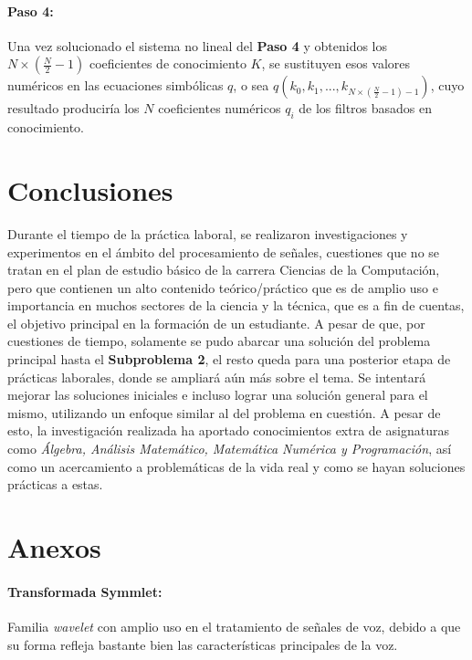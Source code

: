 \documentclass[11pt]{article}
\begin{document}
\paragraph*{Paso 4:}
Una vez solucionado el sistema no lineal del {\bf Paso 4} y obtenidos los \(N \times (\frac{N}{2} - 1)\) coeficientes de conocimiento \(K\), se sustituyen esos valores numéricos en las ecuaciones simbólicas \(q\), o sea 
\(q(k_{0}, k_{1}, ..., k_{N \times (\frac{N}{2} - 1) -1})\), cuyo resultado produciría los \(N\) coeficientes numéricos \(q_{i}\) de los filtros basados en conocimiento.


\clearpage

\section*{Conclusiones}
Durante el tiempo de la práctica laboral, se realizaron investigaciones y experimentos en el ámbito del procesamiento de señales, cuestiones que no se tratan en el plan de estudio básico de la carrera Ciencias de la Computación, 
pero que contienen un alto contenido teórico/práctico que es de amplio uso e importancia en muchos sectores de la ciencia y la técnica, que es a fin de cuentas, el objetivo principal en la formación de un estudiante. A pesar de que, 
por cuestiones de tiempo, solamente se pudo abarcar una solución del problema principal hasta el {\bf Subproblema 2}, el resto queda para una posterior etapa de prácticas laborales, donde se ampliará aún más sobre el tema. Se intentará 
mejorar las soluciones iniciales e incluso lograr una solución general para el mismo, utilizando un enfoque similar al del problema en cuestión. A pesar de esto, la investigación realizada ha aportado conocimientos extra de asignaturas como 
{\it Álgebra, Análisis Matemático, Matemática Numérica y Programación}, así como un acercamiento a problemáticas de la vida real y como se hayan soluciones prácticas a estas. 

\clearpage

\section*{Anexos}

\paragraph*{Transformada Symmlet:}
Familia {\it wavelet} con amplio uso en el tratamiento de señales de voz, debido a que su forma refleja bastante bien las características principales de la voz.
\end{document}
